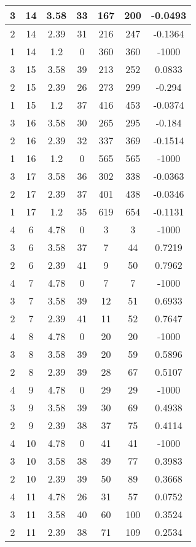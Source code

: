 \documentclass[letterpaper, 12pt]{article}
\begin{document}
\begin{longtable}{|c|c|c|c|c|c|c|}
\hline
3 & 14 & 3.58 & 33 & 167 & 200 & -0.0493 \\
\hline
2 & 14 & 2.39 & 31 & 216 & 247 & -0.1364 \\
\hline
1 & 14 & 1.2 & 0 & 360 & 360 & -1000 \\
\hline
3 & 15 & 3.58 & 39 & 213 & 252 & 0.0833 \\
\hline
2 & 15 & 2.39 & 26 & 273 & 299 & -0.294 \\
\hline
1 & 15 & 1.2 & 37 & 416 & 453 & -0.0374 \\
\hline
3 & 16 & 3.58 & 30 & 265 & 295 & -0.184 \\
\hline
2 & 16 & 2.39 & 32 & 337 & 369 & -0.1514 \\
\hline
1 & 16 & 1.2 & 0 & 565 & 565 & -1000 \\
\hline
3 & 17 & 3.58 & 36 & 302 & 338 & -0.0363 \\
\hline
2 & 17 & 2.39 & 37 & 401 & 438 & -0.0346 \\
\hline
1 & 17 & 1.2 & 35 & 619 & 654 & -0.1131 \\
\hline
4 & 6 & 4.78 & 0 & 3 & 3 & -1000 \\
\hline
3 & 6 & 3.58 & 37 & 7 & 44 & 0.7219 \\
\hline
2 & 6 & 2.39 & 41 & 9 & 50 & 0.7962 \\
\hline
4 & 7 & 4.78 & 0 & 7 & 7 & -1000 \\
\hline
3 & 7 & 3.58 & 39 & 12 & 51 & 0.6933 \\
\hline
2 & 7 & 2.39 & 41 & 11 & 52 & 0.7647 \\
\hline
4 & 8 & 4.78 & 0 & 20 & 20 & -1000 \\
\hline
3 & 8 & 3.58 & 39 & 20 & 59 & 0.5896 \\
\hline
2 & 8 & 2.39 & 39 & 28 & 67 & 0.5107 \\
\hline
4 & 9 & 4.78 & 0 & 29 & 29 & -1000 \\
\hline
3 & 9 & 3.58 & 39 & 30 & 69 & 0.4938 \\
\hline
2 & 9 & 2.39 & 38 & 37 & 75 & 0.4114 \\
\hline
4 & 10 & 4.78 & 0 & 41 & 41 & -1000 \\
\hline
3 & 10 & 3.58 & 38 & 39 & 77 & 0.3983 \\
\hline
2 & 10 & 2.39 & 39 & 50 & 89 & 0.3668 \\
\hline
4 & 11 & 4.78 & 26 & 31 & 57 & 0.0752 \\
\hline
3 & 11 & 3.58 & 40 & 60 & 100 & 0.3524 \\
\hline
2 & 11 & 2.39 & 38 & 71 & 109 & 0.2534 \\

\end{longtable}
\end{document}
